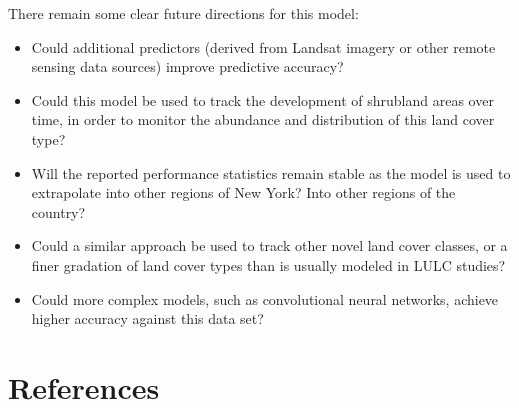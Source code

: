 \documentclass[
  letterpaper,
  DIV=11,
  numbers=noendperiod]{scrartcl}
\providecommand{\tightlist}{%
  \setlength{\itemsep}{0pt}\setlength{\parskip}{0pt}}\usepackage{longtable,booktabs,array}
\begin{document}
There remain some clear future directions for this model:

\begin{itemize}
\tightlist
\item
  Could additional predictors (derived from Landsat imagery or other
  remote sensing data sources) improve predictive accuracy?
\item
  Could this model be used to track the development of shrubland areas
  over time, in order to monitor the abundance and distribution of this
  land cover type?
\item
  Will the reported performance statistics remain stable as the model is
  used to extrapolate into other regions of New York? Into other regions
  of the country?
\item
  Could a similar approach be used to track other novel land cover
  classes, or a finer gradation of land cover types than is usually
  modeled in LULC studies?
\item
  Could more complex models, such as convolutional neural networks,
  achieve higher accuracy against this data set?
\end{itemize}

\newpage{}

\hypertarget{references}{%
\section*{References}\label{references}}
\end{document}
